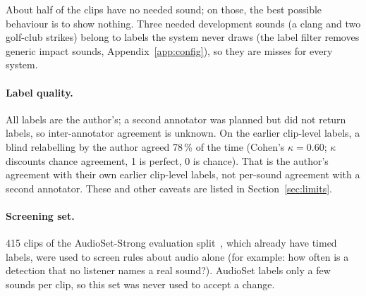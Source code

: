 About half of the clips have no needed sound; on those, the best possible behaviour is to show nothing. Three needed
development sounds (a clang and two golf-club strikes) belong to labels the system never draws (the label filter removes
generic impact sounds, Appendix~\ref{app:config}), so they are misses for every system.

\paragraph{Label quality.} All labels are the author's; a second annotator was planned but did not return labels, so
inter-annotator agreement is unknown. On the earlier clip-level labels, a blind relabelling by the author agreed
78\,\% of the time (Cohen's $\kappa = 0.60$; $\kappa$ discounts chance agreement, 1 is perfect, 0 is chance). That is
the author's agreement with their own earlier clip-level labels, not per-sound agreement with a second annotator. These and other caveats are listed
in Section~\ref{sec:limits}.

\paragraph{Screening set.} 415 clips of the AudioSet-Strong evaluation split~\cite{hershey2021strong}, which already have timed labels, were
used to screen rules about audio alone (for example: how often is a detection that no listener names a real sound?).
AudioSet labels only a few sounds per clip, so this set was never used to accept a change.
